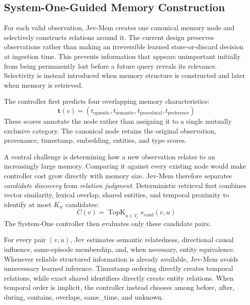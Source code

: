 \documentclass[11pt]{article}
\begin{document}
\subsection{System-One-Guided Memory Construction}
\label{sec:memory-construction}

For each valid observation, Jev-Mem creates one canonical memory node and selectively constructs relations around it. The current design preserves observations rather than making an irreversible learned store-or-discard decision at ingestion time. This prevents information that appears unimportant initially from being permanently lost before a future query reveals its relevance. Selectivity is instead introduced when memory structure is constructed and later when memory is retrieved.

The controller first predicts four overlapping memory characteristics:
\begin{equation}
\mathbf{t}(v)=
(t_{\mathrm{episodic}},
 t_{\mathrm{semantic}},
 t_{\mathrm{procedural}},
 t_{\mathrm{preference}})
\end{equation}
These scores annotate the node rather than assigning it to a single mutually exclusive category. The canonical node retains the original observation, provenance, timestamp, embedding, entities, and type scores.

A central challenge is determining how a new observation relates to an increasingly large memory. Comparing it against every existing node would make controller cost grow directly with memory size. Jev-Mem therefore separates \emph{candidate discovery} from \emph{relation judgment}. Deterministic retrieval first combines vector similarity, lexical overlap, shared entities, and temporal proximity to identify at most $K_w$ candidates:
\begin{equation}
C(v)=
\operatorname{TopK}_{u\in V_t}
s_{\mathrm{cand}}(v,u)
\end{equation}
The System-One controller then evaluates only these candidate pairs.

For every pair $(v,u)$, Jev estimates semantic relatedness, directional causal influence, same-episode membership, and, when necessary, entity equivalence. Whenever reliable structured information is already available, Jev-Mem avoids unnecessary learned inference. Timestamp ordering directly creates temporal relations, while exact shared identifiers directly create entity relations. When temporal order is implicit, the controller instead chooses among before, after, during, contains, overlaps, same\_time, and unknown.
\end{document}
